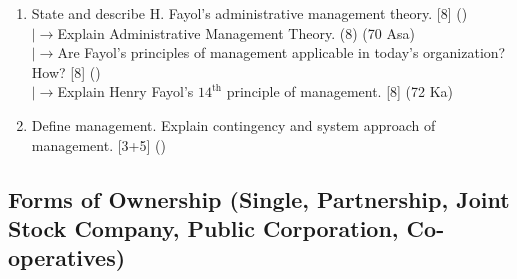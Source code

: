 \documentclass[12pt]{article}
\newcommand{\lb}{\\$\left|\rightarrow\right.$}
\begin{document}
\begin{enumerate}[topsep=0pt, noitemsep]
      \item State and describe H. Fayol's administrative management theory. \hfill [8] ()
        \lb Explain Administrative Management Theory. \hfill (8) (70 Asa)
        \lb Are Fayol's principles of management applicable in today's organization? How? \hfill [8] ()
        \lb Explain Henry Fayol's $14^{\text{th}}$ principle of management. \hfill [8] (72 Ka)

      \item Define management. Explain contingency and system approach of management. \hfill [3+5] ()
    \end{enumerate}

  \subsection{Forms of Ownership (Single, Partnership, Joint Stock Company, Public Corporation, Co-operatives)}
\end{document}
